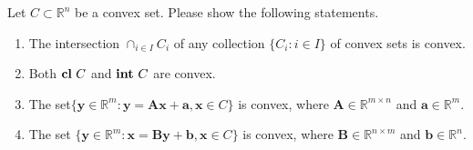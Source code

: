 \documentclass[11pt,letter,notitlepage]{article}
\theoremstyle{definition}
\DeclareMathOperator*{\intp}{\bf int\,}
\DeclareMathOperator*{\cl}{\bf cl\,}
\begin{document}
\newpage

\begin{exercise}
	Let $C \subset \mathbb{R}^n$ be a convex set. Please show the following statements.
	\begin{enumerate}
		\item The intersection $\cap_{i \in I}C_i$ of any collection $\{ C_i:i\in I \}$ of convex sets is convex.
		\item Both $\cl C $ and $\intp C $ are convex.
		\item The set$\{ \mathbf{y}\in\mathbb{R}^m:\mathbf{y}=\mathbf{Ax}+\mathbf{a},\mathbf{x}\in C \}$ is convex, where $\mathbf{A} \in \mathbb{R}^{m \times n}$ and $\mathbf{a} \in \mathbb{R}^m$.
		\item The set $\{ \mathbf{y}\in\mathbb{R}^m:\mathbf{x}=\mathbf{By}+\mathbf{b},\mathbf{x}\in C \}$ is convex, where $\mathbf{B} \in \mathbb{R}^{n \times m}$ and $\mathbf{b} \in \mathbb{R}^n$.
	\end{enumerate}
\end{exercise}
\end{document}

